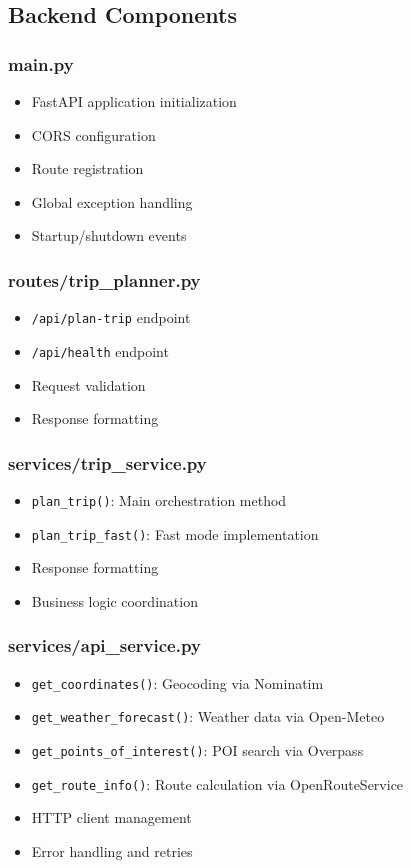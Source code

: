 \documentclass[12pt,a4paper]{report}
\begin{document}
\subsection{Backend Components}

\subsubsection{main.py}
\begin{itemize}
    \item FastAPI application initialization
    \item CORS configuration
    \item Route registration
    \item Global exception handling
    \item Startup/shutdown events
\end{itemize}

\subsubsection{routes/trip\_planner.py}
\begin{itemize}
    \item \texttt{/api/plan-trip} endpoint
    \item \texttt{/api/health} endpoint
    \item Request validation
    \item Response formatting
\end{itemize}

\subsubsection{services/trip\_service.py}
\begin{itemize}
    \item \texttt{plan\_trip()}: Main orchestration method
    \item \texttt{plan\_trip\_fast()}: Fast mode implementation
    \item Response formatting
    \item Business logic coordination
\end{itemize}

\subsubsection{services/api\_service.py}
\begin{itemize}
    \item \texttt{get\_coordinates()}: Geocoding via Nominatim
    \item \texttt{get\_weather\_forecast()}: Weather data via Open-Meteo
    \item \texttt{get\_points\_of\_interest()}: POI search via Overpass
    \item \texttt{get\_route\_info()}: Route calculation via OpenRouteService
    \item HTTP client management
    \item Error handling and retries
\end{itemize}
\end{document}
